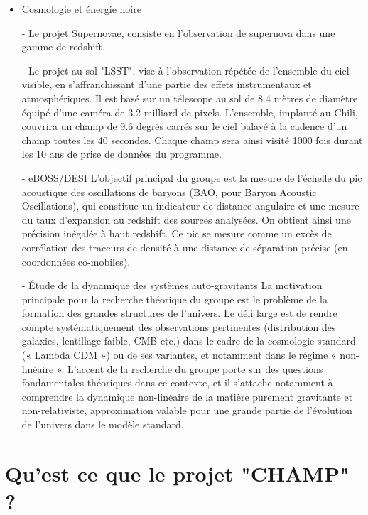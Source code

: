 \documentclass[french,a4paper,12pt]{report}
\begin{document}
\begin{itemize}
		\item Cosmologie et énergie noire
		
			- Le projet Supernovae, consiste en l'observation de supernova dans une gamme de redshift.
			
			- Le projet au sol "LSST", vise à l'observation répétée de l'ensemble du ciel visible, en s'affranchissant d'une partie des effets instrumentaux et atmosphériques. Il est basé sur un télescope au sol de 8.4 mètres de diamètre équipé d'une caméra de 3.2 milliard de pixels. L'ensemble, implanté au Chili, couvrira un champ de 9.6 degrés carrés sur le ciel balayé à la cadence d'un champ toutes les 40 secondes. Chaque champ sera ainsi visité 1000 fois durant les 10 ans de prise de données du programme.
			
			- eBOSS/DESI
			L’objectif principal du groupe est la mesure de l’échelle du pic acoustique des oscillations de baryons (BAO, pour Baryon Acoustic Oscillations), qui constitue un indicateur de distance angulaire et une mesure du taux d’expansion au redshift des sources analysées. On obtient ainsi une précision inégalée à haut redshift. Ce pic se mesure comme un excès de corrélation des traceurs de densité à une distance de séparation précise (en coordonnées co-mobiles).
			
			- Étude de la dynamique des systèmes auto-gravitants
			La motivation principale pour la recherche théorique du groupe est le problème de la formation des grandes structures de l’univers. Le défi large est de rendre compte systématiquement des observations pertinentes (distribution des galaxies, lentillage faible, CMB etc.) dans le cadre de la cosmologie standard (« Lambda CDM ») ou de ses variantes, et notamment dans le régime « non-linéaire ». L’accent de la recherche du groupe porte sur des questions fondamentales théoriques dans ce contexte, et il s’attache notamment à comprendre la dynamique non-linéaire de la matière purement gravitante et non-relativiste, approximation valable pour une grande partie de l’évolution de l’univers dans le modèle standard.		
		  	
  \end{itemize}
  
    
%
%
\part{Qu'est ce que le projet "CHAMP" ?}
\end{document}

